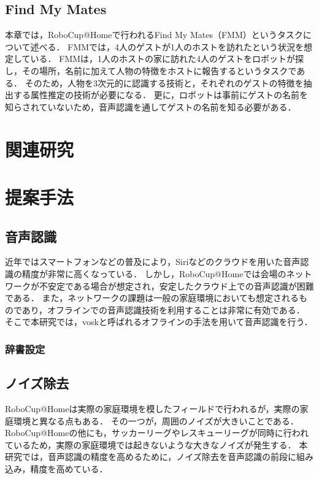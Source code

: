 \documentclass[a4j]{jarticle}
\begin{document}
\subsection{Find My Mates}
本章では，RoboCup@Homeで行われるFind My Mates（FMM）というタスクについて述べる．
FMMでは，4人のゲストが1人のホストを訪れたという状況を想定している．
FMMは，1人のホストの家に訪れた4人のゲストをロボットが探し，その場所，名前に加えて人物の特徴をホストに報告するというタスクである．
そのため，人物を3次元的に認識する技術と，それぞれのゲストの特徴を抽出する属性推定の技術が必要になる．
更に，ロボットは事前にゲストの名前を知らされていないため，音声認識を通してゲストの名前を知る必要がある．


\section{関連研究}


\section{提案手法}

\subsection{音声認識}
近年ではスマートフォンなどの普及により，Siriなどのクラウドを用いた音声認識の精度が非常に高くなっている．
しかし，RoboCup@Homeでは会場のネットワークが不安定である場合が想定され，安定したクラウド上での音声認識が困難である．
また，ネットワークの課題は一般の家庭環境においても想定されるものであり，オフラインでの音声認識技術を利用することは非常に有効である．
そこで本研究では，vosk\cite{vosk_hp}と呼ばれるオフラインの手法を用いて音声認識を行う．

\subsubsection{辞書設定}


\subsection{ノイズ除去}
RoboCup@Homeは実際の家庭環境を模したフィールドで行われるが，実際の家庭環境と異なる点もある．
その一つが，周囲のノイズが大きいことである．
RoboCup@Homeの他にも，サッカーリーグやレスキューリーグが同時に行われているため，実際の家庭環境では起きないような大きなノイズが発生する．
本研究では，音声認識の精度を高めるために，ノイズ除去\cite{sainburg2020finding}を音声認識の前段に組み込み，精度を高めている．
\end{document}
